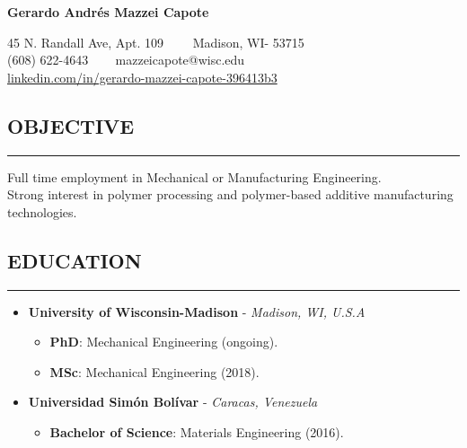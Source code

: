 \documentclass[11pt,letterpaper]{article}
\newenvironment{indentsection}[1]%
{\begin{list}{}%
	{\setlength{\leftmargin}{#1}}%
	\item[]%
}
{\end{list}}
\begin{document}
	\thispagestyle{firststyle}

	
\begin{center}
	{\LARGE \textbf{Gerardo Andrés Mazzei Capote}}

	45 N. Randall Ave, Apt. 109\ \ \textbullet
	\ \ Madison, WI- 53715
	\\
	(608) 622-4643 \ \textbullet
	\ \ mazzeicapote@wisc.edu\\
	\href{https://www.linkedin.com/in/gerardo-mazzei-capote-396413b3}{linkedin.com/in/gerardo-mazzei-capote-396413b3}
	
\end{center}

\vspace{-1em}

\subsection*{OBJECTIVE}
	\vspace{-0.5em}
	\hrule
	\vspace{0.4em}
	\begin{indentsection}{\parindent}
		Full time employment in Mechanical or Manufacturing Engineering.\\
		Strong interest in polymer processing and polymer-based additive manufacturing technologies.
	\end{indentsection}


\subsection*{EDUCATION}
	\vspace{-0.5em}
	\hrule
	\vspace{0.4em}
	\begin{itemize}
	\item
	\textbf{University of Wisconsin-Madison} - \emph{Madison, WI, U.S.A}
	\begin{itemize}	
	\item
	\textbf{PhD}: Mechanical Engineering (ongoing). 
	\item
	\textbf{MSc}: Mechanical Engineering (2018). 
\end{itemize}

	\item
	\textbf{Universidad Simón Bolívar} - \emph{Caracas, Venezuela}
	\begin{itemize}	
		\item
		\textbf{Bachelor of Science}: Materials Engineering (2016). 
	\end{itemize}
	\end{itemize}
\end{document}
